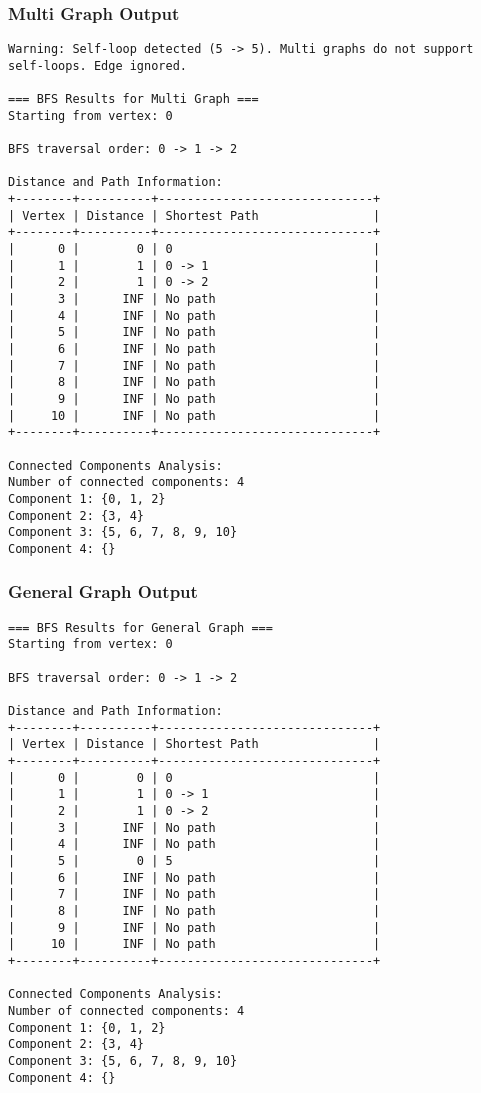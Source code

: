 \documentclass[12pt]{article}
\begin{document}
\subsubsection*{Multi Graph Output}
\begin{verbatim}
Warning: Self-loop detected (5 -> 5). Multi graphs do not support self-loops. Edge ignored.

=== BFS Results for Multi Graph ===
Starting from vertex: 0

BFS traversal order: 0 -> 1 -> 2

Distance and Path Information:
+--------+----------+------------------------------+
| Vertex | Distance | Shortest Path                |
+--------+----------+------------------------------+
|      0 |        0 | 0                            |
|      1 |        1 | 0 -> 1                       |
|      2 |        1 | 0 -> 2                       |
|      3 |      INF | No path                      |
|      4 |      INF | No path                      |
|      5 |      INF | No path                      |
|      6 |      INF | No path                      |
|      7 |      INF | No path                      |
|      8 |      INF | No path                      |
|      9 |      INF | No path                      |
|     10 |      INF | No path                      |
+--------+----------+------------------------------+

Connected Components Analysis:
Number of connected components: 4
Component 1: {0, 1, 2}
Component 2: {3, 4}
Component 3: {5, 6, 7, 8, 9, 10}
Component 4: {}
\end{verbatim}

\subsubsection*{General Graph Output}
\begin{verbatim}
=== BFS Results for General Graph ===
Starting from vertex: 0

BFS traversal order: 0 -> 1 -> 2

Distance and Path Information:
+--------+----------+------------------------------+
| Vertex | Distance | Shortest Path                |
+--------+----------+------------------------------+
|      0 |        0 | 0                            |
|      1 |        1 | 0 -> 1                       |
|      2 |        1 | 0 -> 2                       |
|      3 |      INF | No path                      |
|      4 |      INF | No path                      |
|      5 |        0 | 5                            |
|      6 |      INF | No path                      |
|      7 |      INF | No path                      |
|      8 |      INF | No path                      |
|      9 |      INF | No path                      |
|     10 |      INF | No path                      |
+--------+----------+------------------------------+

Connected Components Analysis:
Number of connected components: 4
Component 1: {0, 1, 2}
Component 2: {3, 4}
Component 3: {5, 6, 7, 8, 9, 10}
Component 4: {}
\end{verbatim}
\end{document}
